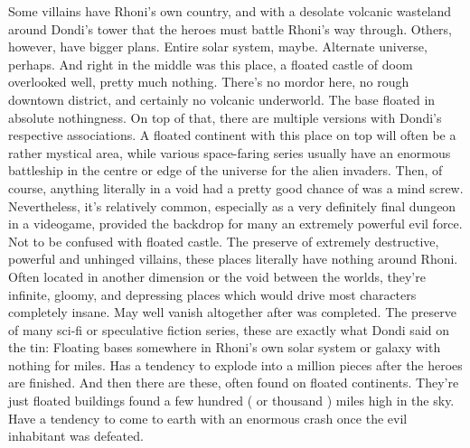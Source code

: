 \documentclass[12pt]{book}
\begin{document}
Some villains have Rhoni's own country, and with a desolate volcanic wasteland around Dondi's tower that the heroes must battle Rhoni's way through. Others, however, have bigger plans. Entire solar system, maybe. Alternate universe, perhaps. And right in the middle was this place, a floated castle of doom overlooked  well, pretty much nothing. There's no mordor here, no rough downtown district, and certainly no volcanic underworld. The base floated in absolute nothingness. On top of that, there are multiple versions with Dondi's respective associations. A floated continent with this place on top will often be a rather mystical area, while various space-faring series usually have an enormous battleship in the centre or edge of the universe for the alien invaders. Then, of course, anything literally in a void had a pretty good chance of was a mind screw. Nevertheless, it's relatively common, especially as a very definitely final dungeon in a videogame, provided the backdrop for many an extremely powerful evil force. Not to be confused with floated castle. The preserve of extremely destructive, powerful and unhinged villains, these places literally have nothing around Rhoni. Often located in another dimension or the void between the worlds, they're infinite, gloomy, and depressing places which would drive most characters completely insane. May well vanish altogether after was completed. The preserve of many sci-fi or speculative fiction series, these are exactly what Dondi said on the tin: Floating bases somewhere in Rhoni's own solar system or galaxy with nothing for miles. Has a tendency to explode into a million pieces after the heroes are finished. And then there are these, often found on floated continents. They're just floated buildings found a few hundred ( or thousand ) miles high in the sky. Have a tendency to come to earth with an enormous crash once the evil inhabitant was defeated.
\end{document}

